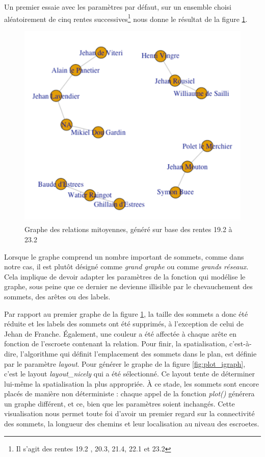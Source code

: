 Un premier essaie avec les paramètres par défaut, sur un ensemble choisi aléatoirement de cinq rentes successives\footnote{Il s'agit des rentes 19.2 , 20.3, 21.4, 22.1 et 23.2 } nous donne le résultat de la figure  \ref{fig:test_graphe}.

\begin{figure}[h]
    \centering
    \includegraphics[scale=0.45]{3.Results/Img/graphe_test.png}
    \caption{Graphe des relations mitoyennes, généré sur base des rentes 19.2 à 23.2 }
    \label{fig:test_graphe}
\end{figure}

Lorsque le graphe comprend un nombre important de sommets, comme dans  notre cas, il est plutôt désigné comme \textit{grand graphe} ou comme \textit{grands réseaux}. Cela implique de devoir adapter les paramètres  de la fonction qui modélise le  graphe, sous peine que ce dernier ne devienne illisible par le chevauchement des sommets, des arêtes ou des labels.

Par rapport au premier graphe de la figure \ref{fig:test_graphe}, la taille des sommets a donc été réduite et les labels des sommets ont été supprimés, à l'exception de celui de Jehan de Franche. Également,  une couleur a été affectée à chaque arête en fonction de l'escroete contenant la relation. Pour finir, la spatialisation, c'est-à-dire,  l'algorithme qui définit l'emplacement des sommets dans le plan, est définie par le paramètre \textit{layout}. Pour générer le graphe de la figure  \ref{fig:plot_igraph}, c'est le layout \textit{layout\_nicely} qui a été sélectionné. Ce layout tente de déterminer lui-même la spatialisation la plus appropriée. À ce stade, les sommets sont encore placés de manière non déterministe : chaque appel de la fonction \textit{plot()}  générera un graphe différent, et ce, bien que les paramètres soient inchangés. Cette visualisation nous permet toute foi d'avoir un premier regard  sur la connectivité  des sommets, la longueur des chemins et leur localisation au niveau des escroetes.

